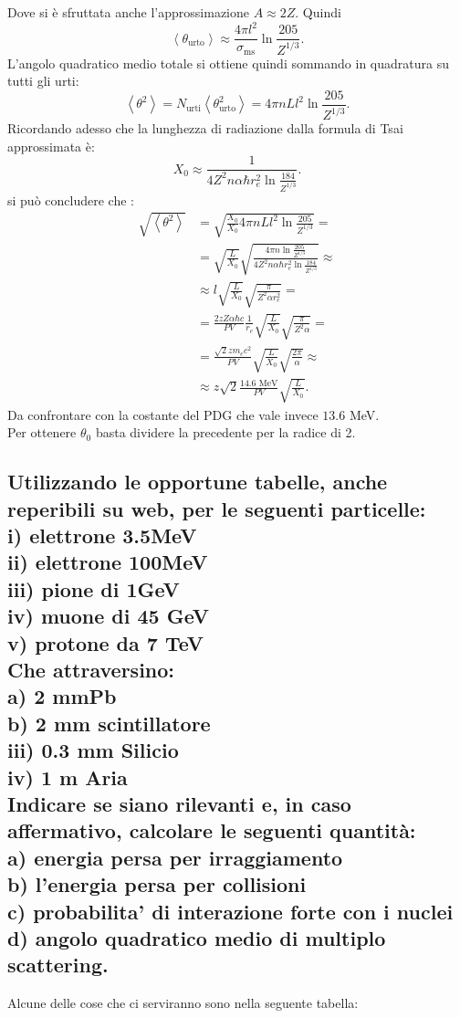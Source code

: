 Dove si è sfruttata anche l'approssimazione $A \approx 2Z$.
Quindi \[
	\left<\theta_{\text{urto}} \right> \approx \frac{4\pi l^2}{\sigma_{\text{ms}}} \ln \frac{205}{Z^{1/3}}
.\] 
L'angolo quadratico medio totale si ottiene quindi sommando in quadratura su tutti gli urti:
\[
	\left< \theta^2 \right> = N_{\text{urti}} \left<\theta^2_{\text{urto}} \right> = 4\pi nL l^2 \ln \frac{205}{Z^{1 /3}} 
.\] 
Ricordando adesso che la lunghezza di radiazione dalla formula di Tsai approssimata è:
\[
	X_0 \approx \frac{1}{4Z^2 n \alpha \hbar r_e^2 \ln \frac{184}{Z^{1 /3}}}
.\] 
si può concludere che :
\begin{align*}
	\sqrt{\left<\theta^2 \right>} &= \sqrt{\frac{X_0}{X_0} 4\pi nL l^2 \ln \frac{205}{Z^{1 /3}}} =\\
	&=  \sqrt{\frac{L}{X_0}} \sqrt{ \frac{4\pi n \ln \frac{205}{Z^{1 /3}} }{4Z^2 n \alpha \hbar r_e^2 \ln \frac{184}{Z^{1 /3}}} } \approx \\ 
	&\approx l \sqrt{\frac{L}{X_0}} \sqrt{\frac{\pi}{Z^2\alpha r_e^2}}=\\
	&= \frac{2zZ \alpha \hbar c}{PV}\frac{1}{r_e}\sqrt{\frac{L}{X_0}} \sqrt{\frac{\pi}{Z^2 \alpha}}=\\
	&= \frac{\sqrt{2} z m_e c^2}{PV} \sqrt{\frac{L}{X_0}} \sqrt{\frac{2\pi}{\alpha}} \approx \\
	&\approx z \sqrt{2} \frac{14.6 \text{ MeV}}{PV}\sqrt{\frac{L}{X_0}} 
.\end{align*}
Da confrontare con la costante del PDG che vale invece $13.6$ MeV.\\
Per ottenere $\theta_0$ basta dividere la precedente per la radice di 2.

\subsection[\hspace{1mm} ]{Utilizzando le opportune tabelle, anche reperibili su web, per le seguenti particelle: \\
i) elettrone 3.5MeV \\
ii) elettrone 100MeV \\
iii) pione di 1GeV \\
iv) muone di 45 GeV \\
v) protone da 7 TeV\\
Che attraversino:\\
a) 2 mmPb\\
b) 2 mm scintillatore\\
iii) 0.3 mm Silicio\\
iv) 1 m Aria\\
Indicare se siano rilevanti e, in caso affermativo, calcolare le seguenti quantità: \\
a) energia persa per irraggiamento \\
b) l’energia persa per collisioni \\
c) probabilita' di interazione forte con i nuclei\\
d) angolo quadratico medio di multiplo scattering.
}
\label{sec:4.b.19}
Alcune delle cose che ci serviranno sono nella seguente tabella:


